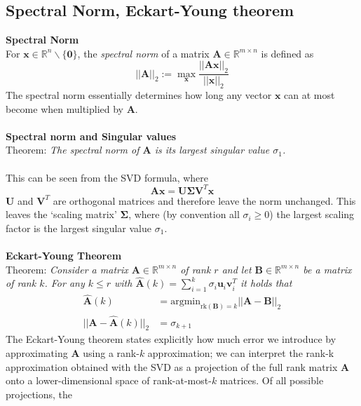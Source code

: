 \documentclass{report}
\begin{document}
\subsection{Spectral Norm, Eckart-Young theorem}
\textbf{Spectral Norm}\\
For $\bm{x}\in\mathbb{R}^n\backslash\{\bm{0}\}$, the \textit{spectral norm} of a matrix 
$\bm{A}\in\mathbb{R}^{m\times n}$ is defined as
\begin{equation*}
||\bm{A}||_2:=\max_{\bm{x}}\frac{||\bm{Ax}||_2}{||\bm{x}||_2}
\end{equation*}
The spectral norm essentially determines how long any vector $\bm{x}$ can at most become when 
multiplied by $\bm{A}$.\\
\vspace{1mm}\\
\textbf{Spectral norm and Singular values}\\
Theorem: \textit{The spectral norm of $\bm{A}$ is its largest singular value $\sigma_1$.}\\
\vspace{1mm}\\
This can be seen from the SVD formula, where 
\begin{equation*}
\bm{Ax}=\bm{U\Sigma V}^T\bm{x}
\end{equation*}
$\bm{U}$ and $\bm{V}^T$ are orthogonal matrices and therefore leave the norm unchanged. 
This leaves the `scaling matrix' $\bm{\Sigma}$, where (by convention all $\sigma_i\geq0$) the 
largest scaling factor is the largest singular value $\sigma_1$.\\
\vspace{1mm}\\
\textbf{Eckart-Young Theorem}\\
Theorem: \textit{Consider a matrix $\bm{A}\in\mathbb{R}^{m\times n}$ of rank $r$ and let 
$\bm{B}\in\mathbb{R}^{m\times n}$ be a matrix of rank $k$.
For any $k\leq r$ with $\widehat{\bm{A}}(k)=
\sum^k_{i=1}\sigma_i\bm{u}_i\bm{v}_i^T$ it holds that}
\begin{align*}
\widehat{\bm{A}}(k)&=\text{argmin}_{\text{rk}(\bm{B})=k}
||\bm{A}-\bm{B}||_2\\
||\bm{A}-\widehat{\bm{A}}(k)||_2&=\sigma_{k+1}
\end{align*}
The Eckart-Young theorem states explicitly how much error we introduce by approximating $\bm{A}$ using a rank-$k$
approximation; we can interpret the rank-k approximation obtained with the SVD as a projection of the full rank
matrix $\bm{A}$ onto a lower-dimensional space of rank-at-most-$k$ matrices. Of all possible projections, the 
\end{document}
